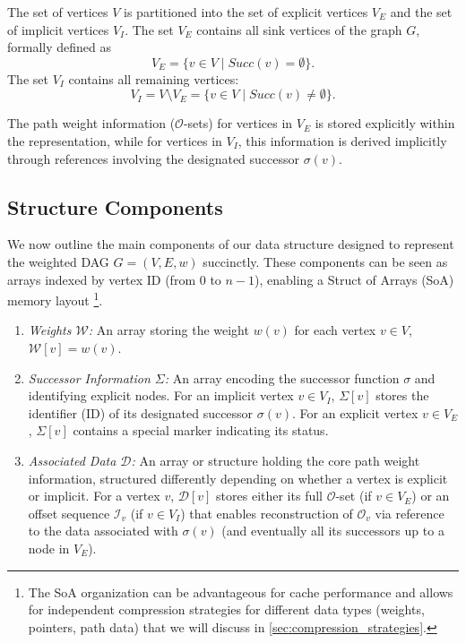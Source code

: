 \begin{definition}
    \label{def:explicit_implicit}
    The set of vertices $V$ is partitioned into the set of explicit vertices $V_E$ and the set of implicit vertices $V_I$. The set $V_E$ contains all sink vertices of the graph $G$, formally defined as
    \[ V_E = \{ v \in V \mid Succ(v) = \emptyset \}. \]
    The set $V_I$ contains all remaining vertices:
    \[ V_I = V \setminus V_E = \{ v \in V \mid Succ(v) \neq \emptyset \}. \]
\end{definition}
The path weight information ($\mathcal{O}$-sets) for vertices in $V_E$ is stored explicitly within the representation, while for vertices in $V_I$, this information is derived implicitly through references involving the designated successor $\sigma(v)$.

\subsection{Structure Components}
\label{subsec:structure_components}

We now outline the main components of our data structure designed to represent the weighted DAG $G=(V,E,w)$ succinctly. These components can be seen as arrays indexed by vertex ID (from $0$ to $n-1$), enabling a Struct of Arrays (SoA) memory layout \footnote{The SoA organization can be advantageous for cache performance and allows for independent compression strategies for different data types (weights, pointers, path data) that we will discuss in \autoref{sec:compression_strategies}.}.

\begin{enumerate}
    \item \emph{Weights $\mathcal{W}$:} An array storing the weight $w(v)$ for each vertex $v \in V$, $\mathcal{W}[v] = w(v)$.
    \item \emph{Successor Information $\Sigma$:} An array encoding the successor function $\sigma$ and identifying explicit nodes. For an implicit vertex $v \in V_I$, $\Sigma[v]$ stores the identifier (ID) of its designated successor $\sigma(v)$. For an explicit vertex $v \in V_E$, $\Sigma[v]$ contains a special marker indicating its status.
    \item \emph{Associated Data $\mathcal{D}$:} An array or structure holding the core path weight information, structured differently depending on whether a vertex is explicit or implicit. For a vertex $v$, $\mathcal{D}[v]$ stores either its full $\mathcal{O}$-set (if $v \in V_E$) or an offset sequence $\mathcal{I}_v$ (if $v \in V_I$) that enables reconstruction of $\mathcal{O}_v$ via reference to the data associated with $\sigma(v)$ (and eventually all its successors up to a node in $V_E$).
\end{enumerate}

